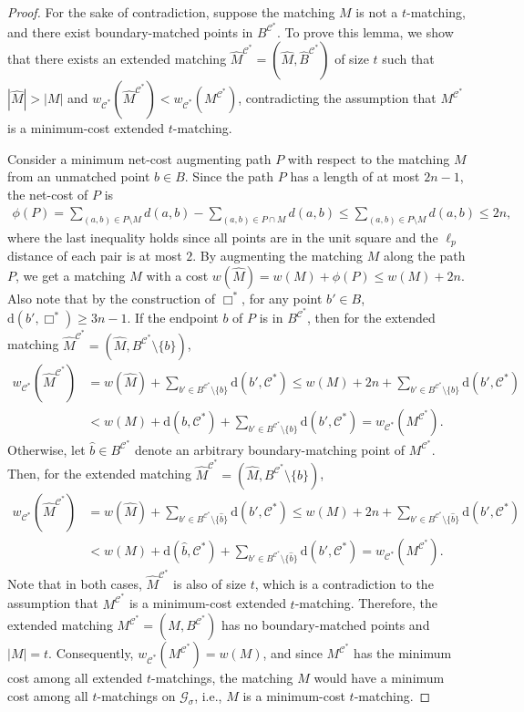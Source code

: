 \documentclass[11pt,onecolumn]{article}
\def\mcC{{\mathcal{C}}}
\def\mcG{{\mathcal{G}}}
\newcommand{\cell}{\Box}
\newcommand{\distance}[2]{\mathrm{d}(#1, #2)}
\begin{document}
\rootinactive*
\begin{proof}
    For the sake of contradiction, suppose the matching $M$ is not a $t$-matching, and there exist boundary-matched points in $B^{\mcC^*}$. To prove this lemma, we show that there exists an extended matching $\hat{M}^{\mcC^*}=(\hat{M}, \hat{B}^{\mcC^*})$ of size $t$ such that $|\hat{M}|>|M|$ and $w_{\mcC^*}(\hat{M}^{\mcC^*})<w_{\mcC^*}(M^{\mcC^*})$, contradicting the assumption that $M^{\mcC^*}$ is a minimum-cost extended $t$-matching. 

    Consider a minimum net-cost augmenting path $P$ with respect to the matching $M$ from an unmatched point $b\in B$. Since the path $P$ has a length of at most $2n-1$, the net-cost of $P$ is 
    \begin{align*}
        \phi(P) = \sum_{(a,b)\in P\setminus M}d(a,b) - \sum_{(a,b)\in P\cap M}d(a,b) \le \sum_{(a,b)\in P\setminus M}d(a,b) \le 2n,  
    \end{align*}
    where the last inequality holds since all points are in the unit square and the $\ell_p$ distance of each pair is at most $2$. By augmenting the matching $M$ along the path $P$, we get a matching $\hat{M}$ with a cost $w(\hat{M})=w(M)+\phi(P)\le w(M) + 2n$. Also note that by the construction of $\cell^*$, for any point $b'\in B$, $\distance{b'}{\cell^*}\ge 3n-1$. If the endpoint $b$ of $P$ is in $B^{\mcC^*}$, then for the extended matching $\hat{M}^{\mcC^*}=(\hat{M}, B^{\mcC^*}\setminus\{b\})$, 
    \begin{align*}
        w_{\mcC^*}(\hat{M}^{\mcC^*})&= w(\hat{M}) + \sum_{b'\in B^{\mcC^*}\setminus\{b\} }\distance{b'}{\mcC^*}
        \le w(M) + 2n + \sum_{b'\in B^{\mcC^*}\setminus\{b\} }\distance{b'}{\mcC^*}\\&<w(M) + \distance{b}{\mcC^*} + \sum_{b'\in B^{\mcC^*}\setminus\{b\}}\distance{b'}{\mcC^*}=
        w_{\mcC^*}(M^{\mcC^*}).
    \end{align*}
    Otherwise, let $\hat{b}\in B^{\mcC^*}$ denote an arbitrary boundary-matching point of $M^{\mcC^*}$. Then, for the extended matching $\hat{M}^{\mcC^*}=(\hat{M}, B^{\mcC^*}\setminus\{\hat{b}\})$, 
    \begin{align*}
        w_{\mcC^*}(\hat{M}^{\mcC^*})&= w(\hat{M}) + \sum_{b'\in B^{\mcC^*}\setminus\{\hat{b}\} }\distance{b'}{\mcC^*}
        \le w(M) + 2n + \sum_{b'\in B^{\mcC^*}\setminus\{\hat{b}\} }\distance{b'}{\mcC^*}\\&<w(M) + \distance{\hat{b}}{\mcC^*} + \sum_{b'\in B^{\mcC^*}\setminus\{\hat{b}\}}\distance{b'}{\mcC^*}=
        w_{\mcC^*}(M^{\mcC^*}).
    \end{align*}
    Note that in both cases, $\hat{M}^{\mcC^*}$ is also of size $t$, which is a contradiction to the assumption that $M^{\mcC^*}$ is a minimum-cost extended $t$-matching. Therefore, the extended matching $M^{\mcC^*}=(M, B^{\mcC^*})$ has no boundary-matched points and $|M| = t$. 
    Consequently, $w_{\mcC^*}(M^{\mcC^*}) = w(M)$, and since $M^{\mcC^*}$ has the minimum cost among all extended $t$-matchings, the matching $M$ would have a minimum cost among all $t$-matchings on $\mcG_\sigma$, i.e., $M$ is a minimum-cost $t$-matching.
\end{proof}
%
%
    
\end{document}
